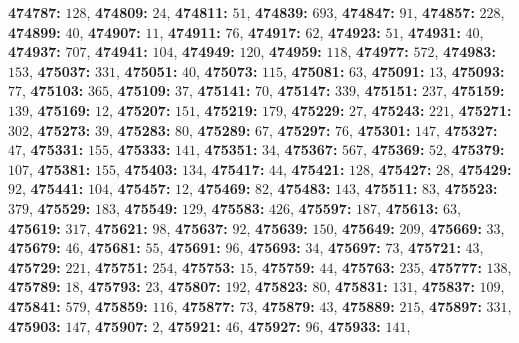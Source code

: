 \textsf{\bfseries 474787:} $128$, \textsf{\bfseries 474809:} $24$, \textsf{\bfseries 474811:} $51$, \textsf{\bfseries 474839:} $693$, \textsf{\bfseries 474847:} $91$, \textsf{\bfseries 474857:} $228$, \textsf{\bfseries 474899:} $40$, \textsf{\bfseries 474907:} $11$, \textsf{\bfseries 474911:} $76$, \textsf{\bfseries 474917:} $62$, \textsf{\bfseries 474923:} $51$, \textsf{\bfseries 474931:} $40$, \textsf{\bfseries 474937:} $707$, \textsf{\bfseries 474941:} $104$, \textsf{\bfseries 474949:} $120$, \textsf{\bfseries 474959:} $118$, \textsf{\bfseries 474977:} $572$, \textsf{\bfseries 474983:} $153$, \textsf{\bfseries 475037:} $331$, \textsf{\bfseries 475051:} $40$, \textsf{\bfseries 475073:} $115$, \textsf{\bfseries 475081:} $63$, \textsf{\bfseries 475091:} $13$, \textsf{\bfseries 475093:} $77$, \textsf{\bfseries 475103:} $365$, \textsf{\bfseries 475109:} $37$, \textsf{\bfseries 475141:} $70$, \textsf{\bfseries 475147:} $339$, \textsf{\bfseries 475151:} $237$, \textsf{\bfseries 475159:} $139$, \textsf{\bfseries 475169:} $12$, \textsf{\bfseries 475207:} $151$, \textsf{\bfseries 475219:} $179$, \textsf{\bfseries 475229:} $27$, \textsf{\bfseries 475243:} $221$, \textsf{\bfseries 475271:} $302$, \textsf{\bfseries 475273:} $39$, \textsf{\bfseries 475283:} $80$, \textsf{\bfseries 475289:} $67$, \textsf{\bfseries 475297:} $76$, \textsf{\bfseries 475301:} $147$, \textsf{\bfseries 475327:} $47$, \textsf{\bfseries 475331:} $155$, \textsf{\bfseries 475333:} $141$, \textsf{\bfseries 475351:} $34$, \textsf{\bfseries 475367:} $567$, \textsf{\bfseries 475369:} $52$, \textsf{\bfseries 475379:} $107$, \textsf{\bfseries 475381:} $155$, \textsf{\bfseries 475403:} $134$, \textsf{\bfseries 475417:} $44$, \textsf{\bfseries 475421:} $128$, \textsf{\bfseries 475427:} $28$, \textsf{\bfseries 475429:} $92$, \textsf{\bfseries 475441:} $104$, \textsf{\bfseries 475457:} $12$, \textsf{\bfseries 475469:} $82$, \textsf{\bfseries 475483:} $143$, \textsf{\bfseries 475511:} $83$, \textsf{\bfseries 475523:} $379$, \textsf{\bfseries 475529:} $183$, \textsf{\bfseries 475549:} $129$, \textsf{\bfseries 475583:} $426$, \textsf{\bfseries 475597:} $187$, \textsf{\bfseries 475613:} $63$, \textsf{\bfseries 475619:} $317$, \textsf{\bfseries 475621:} $98$, \textsf{\bfseries 475637:} $92$, \textsf{\bfseries 475639:} $150$, \textsf{\bfseries 475649:} $209$, \textsf{\bfseries 475669:} $33$, \textsf{\bfseries 475679:} $46$, \textsf{\bfseries 475681:} $55$, \textsf{\bfseries 475691:} $96$, \textsf{\bfseries 475693:} $34$, \textsf{\bfseries 475697:} $73$, \textsf{\bfseries 475721:} $43$, \textsf{\bfseries 475729:} $221$, \textsf{\bfseries 475751:} $254$, \textsf{\bfseries 475753:} $15$, \textsf{\bfseries 475759:} $44$, \textsf{\bfseries 475763:} $235$, \textsf{\bfseries 475777:} $138$, \textsf{\bfseries 475789:} $18$, \textsf{\bfseries 475793:} $23$, \textsf{\bfseries 475807:} $192$, \textsf{\bfseries 475823:} $80$, \textsf{\bfseries 475831:} $131$, \textsf{\bfseries 475837:} $109$, \textsf{\bfseries 475841:} $579$, \textsf{\bfseries 475859:} $116$, \textsf{\bfseries 475877:} $73$, \textsf{\bfseries 475879:} $43$, \textsf{\bfseries 475889:} $215$, \textsf{\bfseries 475897:} $331$, \textsf{\bfseries 475903:} $147$, \textsf{\bfseries 475907:} $2$, \textsf{\bfseries 475921:} $46$, \textsf{\bfseries 475927:} $96$, \textsf{\bfseries 475933:} $141$, 
